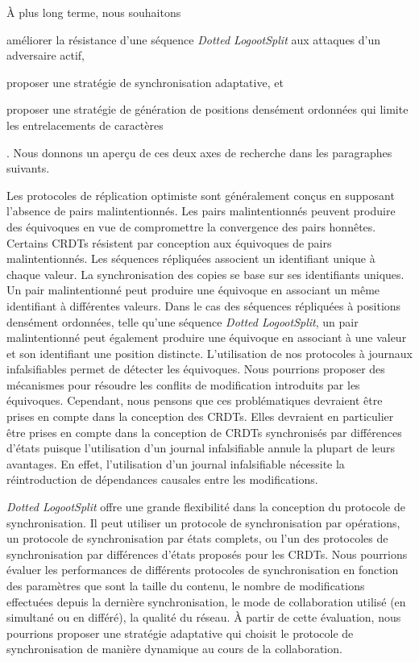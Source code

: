 À plus long terme, nous souhaitons \begin{inlinelist}\item améliorer la résistance d'une séquence \emph{Dotted LogootSplit} aux attaques d'un adversaire actif, \item proposer une stratégie de synchronisation adaptative, et \item proposer une stratégie de génération de positions densément ordonnées qui limite les entrelacements de caractères\end{inlinelist}.
Nous donnons un aperçu de ces deux axes de recherche dans les paragraphes suivants.

Les protocoles de réplication optimiste sont généralement conçus en supposant l'absence de pairs malintentionnés.
Les pairs malintentionnés peuvent produire des équivoques en vue de compromettre la convergence des pairs honnêtes.
Certains \acp{CRDT} résistent par conception aux équivoques de pairs malintentionnés.
Les séquences répliquées associent un identifiant unique à chaque valeur.
La synchronisation des copies se base sur ses identifiants uniques.
Un pair malintentionné peut produire une équivoque en associant un même identifiant à différentes valeurs.
Dans le cas des séquences répliquées à positions densément ordonnées, telle qu'une séquence \emph{Dotted LogootSplit}, un pair malintentionné peut également produire une équivoque en associant à une valeur et son identifiant une position distincte.
L'utilisation de nos protocoles à journaux infalsifiables permet de détecter les équivoques.
Nous pourrions proposer des mécanismes pour résoudre les conflits de modification introduits par les équivoques.
Cependant, nous pensons que ces problématiques devraient être prises en compte dans la conception des \acp{CRDT}.
Elles devraient en particulier être prises en compte dans la conception de \acp{CRDT} synchronisés par différences d'états puisque l'utilisation d'un journal infalsifiable annule la plupart de leurs avantages.
En effet, l'utilisation d'un journal infalsifiable nécessite la réintroduction de dépendances causales entre les modifications.

\emph{Dotted LogootSplit} offre une grande flexibilité dans la conception du protocole de synchronisation.
Il peut utiliser un protocole de synchronisation par opérations, un protocole de synchronisation par états complets, ou l'un des protocoles de synchronisation par différences d'états proposés pour les \acp{CRDT}.
Nous pourrions évaluer les performances de différents protocoles de synchronisation en fonction des paramètres que sont la taille du contenu, le nombre de modifications effectuées depuis la dernière synchronisation, le mode de collaboration utilisé (en simultané ou en différé), la qualité du réseau.
À partir de cette évaluation, nous pourrions proposer une stratégie adaptative qui choisit le protocole de synchronisation de manière dynamique au cours de la collaboration.

